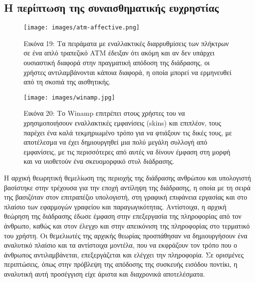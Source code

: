 \documentclass[
]{article}
\begin{document}
\hypertarget{ux3b7-ux3c0ux3b5ux3c1ux3afux3c0ux3c4ux3c9ux3c3ux3b7-ux3c4ux3b7ux3c2-ux3c3ux3c5ux3bdux3b1ux3b9ux3c3ux3b8ux3b7ux3bcux3b1ux3c4ux3b9ux3baux3aeux3c2-ux3b5ux3c5ux3c7ux3c1ux3b7ux3c3ux3c4ux3afux3b1ux3c2}{%
\subsection{Η περίπτωση της συναισθηματικής
ευχρηστίας}\label{ux3b7-ux3c0ux3b5ux3c1ux3afux3c0ux3c4ux3c9ux3c3ux3b7-ux3c4ux3b7ux3c2-ux3c3ux3c5ux3bdux3b1ux3b9ux3c3ux3b8ux3b7ux3bcux3b1ux3c4ux3b9ux3baux3aeux3c2-ux3b5ux3c5ux3c7ux3c1ux3b7ux3c3ux3c4ux3afux3b1ux3c2}}

\leavevmode{}%
\begin{figure}
\hypertarget{fig:atm-affective}{%
\centering
\texttt{[image: images/atm-affective.png]}
\caption{Εικόνα 19: Τα πειράματα με εναλλακτικές διαρρυθμίσεις των
πλήκτρων σε ένα απλό τραπεζικό ATM έδειξαν ότι ακόμη και αν δεν υπάρχει
ουσιαστική διαφορά στην πραγματική απόδοση της διάδρασης, οι χρήστες
αντιλαμβάνονται κάποια διαφορά, η οποία μπορεί να ερμηνευθεί από τη
σκοπιά της αισθητικής.}\label{fig:atm-affective}
}
\end{figure}

\leavevmode{}%
\begin{figure}
\hypertarget{fig:winamp}{%
\centering
\texttt{[image: images/winamp.jpg]}
\caption{Εικόνα 20: Το Winamp επιτρέπει στους χρήστες του να
χρησιμοποιήσουν εναλλακτικές εμφανίσεις (skins) και επιπλέον, τους
παρέχει ένα καλά τεκμηριωμένο τρόπο για να φτιάξουν τις δικές τους, με
αποτέλεσμα να έχει δημιουργηθεί μια πολύ μεγάλη συλλογή από εμφανίσεις,
με τις περισσότερες από αυτές να δίνουν έμφαση στη μορφή και να
υιοθετούν ένα σκευομορφικό στυλ διάδρασης.}\label{fig:winamp}
}
\end{figure}

Η αρχική θεωρητική θεμελίωση της περιοχής της διάδρασης ανθρώπου και
υπολογιστή βασίστηκε στην τρέχουσα για την εποχή αντίληψη της διάδρασης,
η οποία με τη σειρά της βασιζόταν στον επιτραπέζιο υπολογιστή, στη
γραφική επιφάνεια εργασίας και στο πλαίσιο των εφαρμογών γραφείου και
παραγωγικότητας. Αντίστοιχα, η αρχική θεώρηση της διάδρασης έδωσε έμφαση
στην επεξεργασία της πληροφορίας από τον άνθρωπο, καθώς και στον έλεγχο
και στην απεικόνιση της πληροφορίας στο τερματικό του χρήστη. Οι
θεμελιωτές της αρχικής θεωρίας προσπάθησαν να δημιουργήσουν ένα
αναλυτικό πλαίσιο και τα αντίστοιχα μοντέλα, που να εκφράζουν τον τρόπο
που ο άνθρωπος αντιλαμβάνεται, επεξεργάζεται και ελέγχει την πληροφορία.
Σε ορισμένες περιπτώσεις, όπως στην πρόβλεψη της απόδοσης της συσκευής
εισόδου ποντίκι, η αναλυτική αυτή προσέγγιση είχε άριστα και διαχρονικά
αποτελέσματα.
\end{document}
